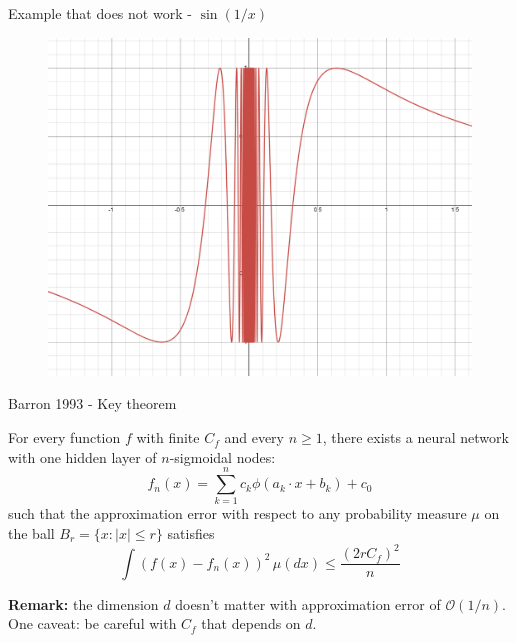 \documentclass[aspectratio=169]{beamer} %
\begin{document}
\begin{frame}{Example that does not work - $\sin(1/x)$}
    \begin{figure}
        \centering
        \includegraphics[width=0.6\linewidth]{Reinforcement Learning/Curse of Dimensionality/sin1_x.png}
    \end{figure}
\end{frame}

\begin{frame}{Barron 1993 - Key theorem}
\begin{theorem}
    For every function $f$ with finite $C_f$ and every $n\ge 1$, there exists a neural network with one hidden layer of $n$-sigmoidal nodes:
    $$
    f_n(x) = \sum_{k=1}^n c_k\phi(a_k \cdot x + b_k)+c_0
    $$
    such that the approximation error with respect to any probability measure $\mu$ on the ball $B_r = \{x: |x|\le r\}$ satisfies
    $$
    \int (f(x)-f_n(x))^2 \, \mu(dx) \le \frac{(2rC_f)^2}{n}
    $$
\end{theorem}
\textbf{Remark:} the dimension $d$ doesn't matter with  approximation error of $\mathcal{O}(1/n)$. One caveat: be careful with $C_f$ that depends on $d$.
    
\end{frame}
\end{document}
